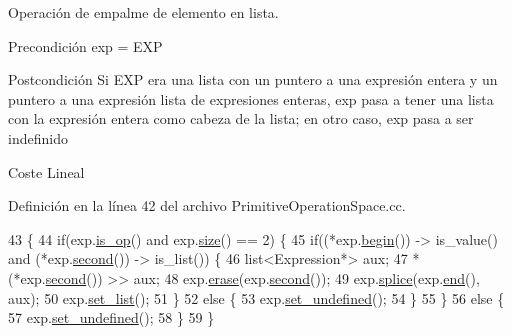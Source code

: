 Operación de empalme de elemento en lista. 

\begin{DoxyPrecond}{Precondición}
\textquotesingle{}exp\textquotesingle{} = \textquotesingle{}E\+XP\textquotesingle{} 
\end{DoxyPrecond}
\begin{DoxyPostcond}{Postcondición}
Si \textquotesingle{}E\+XP\textquotesingle{} era una lista con un puntero a una expresión entera y un puntero a una expresión lista de expresiones enteras, \textquotesingle{}exp\textquotesingle{} pasa a tener una lista con la expresión entera como cabeza de la lista; en otro caso, \textquotesingle{}exp\textquotesingle{} pasa a ser indefinido 
\end{DoxyPostcond}
\begin{DoxyParagraph}{Coste}
Lineal 
\end{DoxyParagraph}


Definición en la línea 42 del archivo Primitive\+Operation\+Space.\+cc.


\begin{DoxyCode}
43 \{
44   \textcolor{keywordflow}{if}(exp.\hyperlink{class_expression_a422fb496720b177eaed37a9694613384}{is\_op}() and exp.\hyperlink{class_expression_a0e8980139631cf7bc9fd3bca9d8caddc}{size}() == 2) \{
45     \textcolor{keywordflow}{if}((*exp.\hyperlink{class_expression_a0ed7767d72f93c9121bb73afead5782a}{begin}()) -> is\_value() and (*exp.\hyperlink{class_expression_ae53f7febf676d564d6393bf2762fc08e}{second}()) -> is\_list()) \{
46       list<Expression*> aux;
47       *(*exp.\hyperlink{class_expression_ae53f7febf676d564d6393bf2762fc08e}{second}()) >> aux;
48       exp.\hyperlink{class_expression_a3fcf4ce4c5efde7795a6b3b004abf0ad}{erase}(exp.\hyperlink{class_expression_ae53f7febf676d564d6393bf2762fc08e}{second}());
49       exp.\hyperlink{class_expression_afcd885fc3562809ede2796b722bb4854}{splice}(exp.\hyperlink{class_expression_af5229aaf6bbb7200db55f220f315192e}{end}(), aux);
50       exp.\hyperlink{class_expression_a66db516be4fa87d58df4806938676508}{set\_list}();
51     \}
52     \textcolor{keywordflow}{else} \{
53       exp.\hyperlink{class_expression_a1d3ddfe83d20f47930792807e8b22248}{set\_undefined}();
54     \}
55   \}
56   \textcolor{keywordflow}{else} \{
57     exp.\hyperlink{class_expression_a1d3ddfe83d20f47930792807e8b22248}{set\_undefined}();
58   \}
59 \}
\end{DoxyCode}
